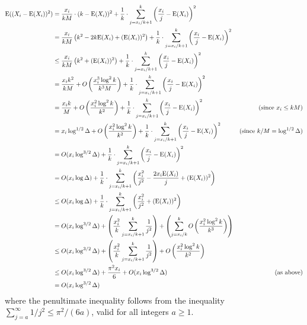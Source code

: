 \documentclass{patmorin}
\begin{document}
\begin{align*}
  \mathrm{E}((X_i-\mathrm{E}(X_i))^2)
  & = \frac{x_i}{kM}\cdot(k-\mathrm{E}(X_i))^2
    + \frac{1}{k}\cdot\sum_{j=x_i/k+1}^k \left(\frac{x_i}{j}-\mathrm{E}(X_i)\right)^2 \\
  & = \frac{x_i}{kM}\left(k^2-2k\mathrm{E}(X_i)+(\mathrm{E}(X_i))^2\right)
    + \frac{1}{k}\cdot \sum_{j=x_i/k+1}^k \left(\frac{x_i}{j}-\mathrm{E}(X_i)\right)^2 \\
  & \le \frac{x_i}{kM}\left(k^2 + (\mathrm{E}(X_i))^2\right)
    + \frac{1}{k}\cdot \sum_{j=x_i/k+1}^k \left(\frac{x_i}{j}-\mathrm{E}(X_i)\right)^2 \\
  & = \frac{x_i k^2}{kM} + O\left(\frac{x_i^3\log^2 k}{k^3M}\right)
      + \frac{1}{k}\cdot\sum_{j=x_i/k+1}^k \left(\frac{x_i}{j}-\mathrm{E}(X_i)\right)^2 \\
  & = \frac{x_i k}{M} + O\left(\frac{x_i^2\log^2 k}{k^2}\right)
      + \frac{1}{k}\cdot\sum_{j=x_i/k+1}^k \left(\frac{x_i}{j}-\mathrm{E}(X_i)\right)^2
      & \text{(since $x_i\le kM$)} \\
  & = x_i\log^{1/2}\Delta + O\left(\frac{x_i^2\log^2 k}{k^2}\right)
      + \frac{1}{k}\cdot\sum_{j=x_i/k+1}^k \left(\frac{x_i}{j}-\mathrm{E}(X_i)\right)^2
      & \text{(since $k/M=\log^{1/2}\Delta$)}
      \\
  & = O(x_i\log^{3/2}\Delta) + \frac{1}{k}\cdot\sum_{j=x_i/k+1}^k \left(\frac{x_i}{j}-\mathrm{E}(X_i)\right)^2 \\
 & = O(x_i\log\Delta) + \frac{1}{k}\cdot\sum_{j=x_i/k+1}^k \left(\frac{x_i^2}{j^2}-\frac{2x_i \mathrm{E}(X_i)}{j} + (\mathrm{E}(X_i))^2\right) \\
 & \le O(x_i\log\Delta) + \frac{1}{k}\cdot\sum_{j=x_i/k+1}^k \left(\frac{x_i^2}{j^2} + (\mathrm{E}(X_i))^2\right) \\
 & = O(x_i\log^{3/2}\Delta) +  \left(\frac{x_i^2}{k}\sum_{j=x_i/k+1}^k\frac{1}{j^2}\right)
   + \left(\sum_{j=x_i/k}^k O\left(\frac{x_i^2\log^2 k}{k^3}\right)\right) \\
 & \le O(x_i\log^{3/2}\Delta) + \left(\frac{x_i^2}{k}\sum_{j=x_i/k+1}^k\frac{1}{j^2}\right)
    + O\left(\frac{x_i^2\log^2 k}{k^2}\right)\\
  & \le O(x_i\log^{3/2}\Delta) + \frac{\pi^2 x_i}{6} + O(x_i\log^{3/2}\Delta)
  & \text{(as above)} \\
  & = O(x_i\log^{3/2}\Delta)
\end{align*}
where the penultimate inequality follows from the inequality $\sum_{j=a}^{\infty} 1/j^2 \le \pi^2/(6a)$, valid for all integers $a\ge 1$.
\end{document}
